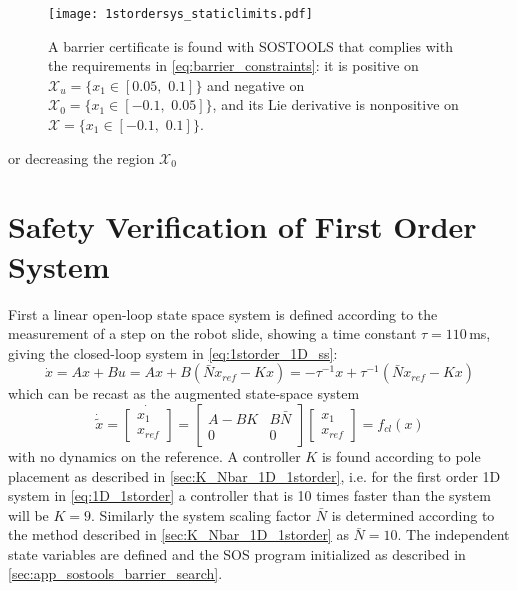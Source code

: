 \begin{figure}[htbp]
	\hspace*{-12mm}
	\texttt{[image: 1stordersys\_staticlimits.pdf]}
	\caption{A barrier certificate is found with SOSTOOLS that complies with the requirements in \autoref{eq:barrier_constraints}: it is positive on $\mathcal{X}_u=\{x_1\in [0.05,\,\,0.1]\}$ and negative on $\mathcal{X}_0=\{x_1\in [-0.1,\,\,0.05]\}$, and its Lie derivative is nonpositive on $\mathcal{X}=\{x_1\in [-0.1,\,\,0.1]\}$.}
	\label{fig:barrier_1storder_staticlim}
\end{figure}

or decreasing the region $\mathcal{X}_0$

\section{Safety Verification of First Order System}
First a linear open-loop state space system is defined according to the measurement of a step on the robot slide, showing a time constant $\tau=110$\,ms, giving the closed-loop system in \autoref{eq:1storder_1D_ss}:
\begin{equation}
\dot{x} = Ax+Bu = Ax+B(\bar{N}x_{ref}-Kx) = %
-\tau^{-1}x+\tau^{-1}(\bar{N}x_{ref}-Kx)
\label{eq:1D_1storder}
\end{equation} 
which can be recast as the augmented state-space system
\begin{equation}
\dot{\tilde{x}}=
\dot{\begin{bmatrix}
	x_1\\x_{ref}
	\end{bmatrix}} =
\begin{bmatrix}
A-BK&B\bar{N}\\0&0
\end{bmatrix}
\begin{bmatrix}
x_1\\x_{ref}
\end{bmatrix}
= f_{cl}(x)
\label{eq:xtilde_1storder_1D}
\end{equation}
with no dynamics on the reference. A controller $K$ is found according to pole placement as described in \autoref{sec:K_Nbar_1D_1storder}, i.e. for the first order 1D system in \autoref{eq:1D_1storder} a controller that is 10 times faster than the system will be $K=9$. Similarly the system scaling factor $\bar{N}$ is determined according to the method described in \autoref{sec:K_Nbar_1D_1storder} as $\bar{N}=10$.
The independent state variables are defined and the SOS program initialized as described in \autoref{sec:app_sostools_barrier_search}.

